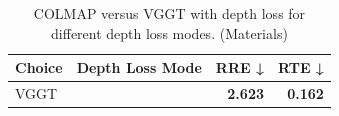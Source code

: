 \begin{table}[H]
\caption{COLMAP versus VGGT with depth loss for different depth loss modes. (Materials)}
\label{tab:05_depth_loss_mode_materials}
\begin{tabular}{llrr}
\toprule
Choice & Depth Loss Mode & RRE ↓ & RTE ↓ \\
\midrule
VGGT &  & \textbf{2.623} & \textbf{0.162} \\
\bottomrule
\end{tabular}
\end{table}
